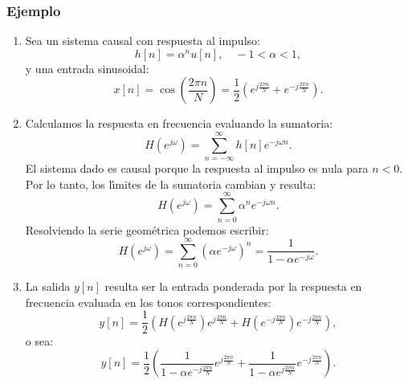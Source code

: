 \subsubsection{Ejemplo}

\begin{enumerate}
	
	\item Sea un sistema causal con respuesta al impulso:
	\begin{equation}
		h[n] = \alpha^n u[n], \quad -1 < \alpha < 1,
	\end{equation}
	y una entrada sinusoidal:
	\begin{equation}
		x[n] = \cos\left( \frac{2\pi n}{N} \right) = \frac{1}{2} \left( e^{j\frac{2\pi n}{N}} + e^{-j\frac{2\pi n}{N}} \right).
	\end{equation}
	
	\item Calculamos la respuesta en frecuencia evaluando la sumatoria:
	\begin{equation}
		H(e^{j\omega}) = \sum_{n=-\infty}^{\infty} h[n] e^{-j\omega n}.
	\end{equation}
	El sistema dado es causal porque la respuesta al impulso es nula para $n < 0$. Por lo tanto, los l\'{\i}mites de la sumatoria cambian y resulta:
	\begin{equation}
		H(e^{j\omega}) = \sum_{n=0}^{\infty} \alpha^n e^{-j\omega n}.
	\end{equation}
	Resolviendo la serie geométrica podemos escribir:
	\begin{equation}
		H(e^{j\omega}) = \sum_{n=0}^{\infty} (\alpha e^{-j\omega})^n = \frac{1}{1 - \alpha e^{-j\omega}}.
	\end{equation}
	
	\item La salida $y[n]$ resulta ser la entrada ponderada por la respuesta en frecuencia evaluada en los tonos correspondientes:
	\begin{equation}
		y[n] = \frac{1}{2} \left( H\left(e^{j\frac{2\pi n}{N}}\right) e^{j\frac{2\pi n}{N}} + H\left(e^{-j\frac{2\pi n}{N}}\right) e^{-j\frac{2\pi n}{N}} \right),
	\end{equation}
	o sea:
	\begin{equation}
		y[n] = \frac{1}{2} \left( \frac{1}{1 - \alpha e^{-j\frac{2\pi n}{N}}} e^{j\frac{2\pi n}{N}} + \frac{1}{1 - \alpha e^{j\frac{2\pi n}{N}}} e^{-j\frac{2\pi n}{N}} \right).
	\end{equation}
	
\end{enumerate}

